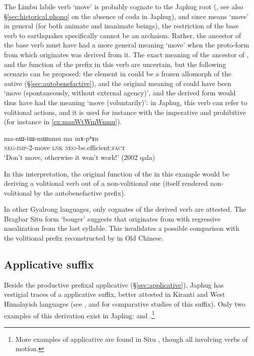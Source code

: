 The Limbu labile verb  `move' \citep{michailovsky02dico} is probably cognate to the Japhug root (\citealt[212]{jacques17pkiranti}, see also §\ref{sec:historical.phono} on the absence of coda in Japhug), and since  means `move' in general (for both animate and inanimate beings), the restriction of the base verb  to earthquakes specifically cannot be an archaism. Rather, the ancestor of the base verb  must have had a more general meaning `move' when the proto-form from which  originates was derived from it. The exact meaning of the ancestor of , and the function of the  prefix in this verb are uncertain, but the following scenario can be proposed: the  element in  could be a frozen allomorph of the autive (§\ref{sec:autobenefactive}), and the original meaning of  could have been `move (spontaneously, without external agency)', and the derived form  would thus have had the meaning `move (voluntarily)': in Japhug, this verb can refer to volitional actions, and it is used for instance with the imperative and prohibitive (for instance in \ref{ex:manWtWmWnmu}).

\begin{exe}
\ex \label{ex:manWtWmWnmu}
\gll ma-nɯ-tɯ-mɯnmu ma mɤ-pʰɤn \\
\textsc{neg}-\textsc{imp}-2-move \textsc{lnk} \textsc{neg}-be.efficient:\textsc{fact} \\
\glt `Don't move, otherwise it won't work!' (2002 qala)
\end{exe}

In this interpretation, the original function of the  in this example would be deriving a volitional verb out of a non-volitional one (itself rendered non-volitional by the autobenefactive prefix). 

In other Gyalrong languages, only cognates of the derived verb  are attested. The Bragbar Situ form  `bouger' \citep{zhangshuya20these} suggests that  originates from  with regressive nasalization from the last syllable.   This invalidates a possible comparison with the volitional  prefix reconstructed by \citet[55]{bs14oc} in Old Chinese.

 
\subsection{Applicative  suffix} \label{sec:applicative.t}
Beside the productive prefixal  applicative (§\ref{sec:applicative}), Japhug has vestigial traces of a  applicative suffix, better attested in Kiranti and West Himalayish languages (see \citealt{michailovsky85dental}, \citet{jacques15derivational.khaling} and \citealt{jacques16ssuffixes} for comparative studies of this suffix). Only two examples of this derivation exist in Japhug:  and .\footnote{More examples of  applicative are found in Situ \citep{linyj17space, zhangshuya20these}, though all involving verbs of motion. }


